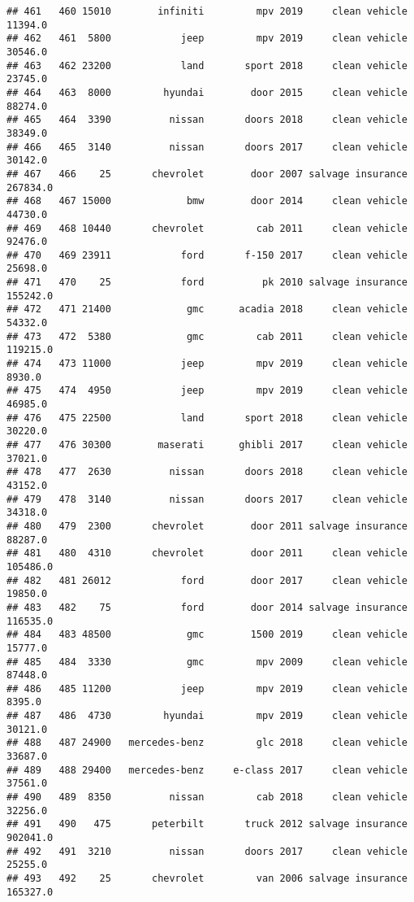 \documentclass[
]{article}
\begin{document}
\begin{verbatim}
## 461   460 15010        infiniti         mpv 2019     clean vehicle   11394.0
## 462   461  5800            jeep         mpv 2019     clean vehicle   30546.0
## 463   462 23200            land       sport 2018     clean vehicle   23745.0
## 464   463  8000         hyundai        door 2015     clean vehicle   88274.0
## 465   464  3390          nissan       doors 2018     clean vehicle   38349.0
## 466   465  3140          nissan       doors 2017     clean vehicle   30142.0
## 467   466    25       chevrolet        door 2007 salvage insurance  267834.0
## 468   467 15000             bmw        door 2014     clean vehicle   44730.0
## 469   468 10440       chevrolet         cab 2011     clean vehicle   92476.0
## 470   469 23911            ford       f-150 2017     clean vehicle   25698.0
## 471   470    25            ford          pk 2010 salvage insurance  155242.0
## 472   471 21400             gmc      acadia 2018     clean vehicle   54332.0
## 473   472  5380             gmc         cab 2011     clean vehicle  119215.0
## 474   473 11000            jeep         mpv 2019     clean vehicle    8930.0
## 475   474  4950            jeep         mpv 2019     clean vehicle   46985.0
## 476   475 22500            land       sport 2018     clean vehicle   30220.0
## 477   476 30300        maserati      ghibli 2017     clean vehicle   37021.0
## 478   477  2630          nissan       doors 2018     clean vehicle   43152.0
## 479   478  3140          nissan       doors 2017     clean vehicle   34318.0
## 480   479  2300       chevrolet        door 2011 salvage insurance   88287.0
## 481   480  4310       chevrolet        door 2011     clean vehicle  105486.0
## 482   481 26012            ford        door 2017     clean vehicle   19850.0
## 483   482    75            ford        door 2014 salvage insurance  116535.0
## 484   483 48500             gmc        1500 2019     clean vehicle   15777.0
## 485   484  3330             gmc         mpv 2009     clean vehicle   87448.0
## 486   485 11200            jeep         mpv 2019     clean vehicle    8395.0
## 487   486  4730         hyundai         mpv 2019     clean vehicle   30121.0
## 488   487 24900   mercedes-benz         glc 2018     clean vehicle   33687.0
## 489   488 29400   mercedes-benz     e-class 2017     clean vehicle   37561.0
## 490   489  8350          nissan         cab 2018     clean vehicle   32256.0
## 491   490   475       peterbilt       truck 2012 salvage insurance  902041.0
## 492   491  3210          nissan       doors 2017     clean vehicle   25255.0
## 493   492    25       chevrolet         van 2006 salvage insurance  165327.0

\end{verbatim}
\end{document}
